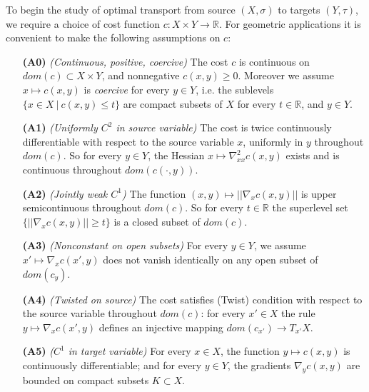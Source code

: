 \documentclass[12pt]{amsart}
\theoremstyle{remark}
\newcommand{\bR}{\mathbb{R}}
\begin{document}
To begin the study of optimal transport from source $(X,\sigma)$ to targets $(Y,\tau)$, we require a choice of cost function $c: X\times Y \to \bR$. For geometric applications it is convenient to make the following assumptions on $c$: 

\begin{itemize}
\item[\textbf{(A0)}]\emph{(Continuous, positive, coercive)} The cost $c$ is continuous on $dom(c) \subset X\times Y$, and nonnegative $c(x,y)\geq 0$. Moreover we assume $x\mapsto c(x,y)$ is \emph{coercive} for every $y\in Y$, i.e. the sublevels $\{x\in X~|~ c(x,y) \leq t\}$ are compact subsets of $X$ for every $t\in \bR$, and $y\in Y$.  


\item[\textbf{(A1)}]\emph{(Uniformly $C^2$ in source variable)} The cost is twice continuously differentiable with respect to the source variable $x$, uniformly in $y$ throughout $dom(c)$. So for every $y\in Y$, the Hessian $x\mapsto \nabla_{xx}^2 c(x,y)$ exists and is continuous throughout $dom(c(\cdot, y))$. 

\item[\textbf{(A2)}]\emph{(Jointly weak $C^1$)} The function $(x,y)\mapsto ||\nabla_x c(x,y)||$ is upper semicontinuous throughout $dom(c)$. So for every $t\in \bR$ the superlevel set $\{ ||\nabla_x c(x,y)|| \geq t\}$ is a closed subset of $dom(c)$. 

\item[\textbf{(A3)}]\emph{(Nonconstant on open subsets)} For every $y\in Y$, we assume $x'\mapsto \nabla_x c(x',y)$ does not vanish identically on any open subset of $dom(c_y)$.  



\item[\textbf{(A4)}]\emph{(Twisted on source)} The cost satisfies (Twist) condition with respect to the source variable throughout $dom(c)$: for every $x'\in X$ the rule $y\mapsto \nabla_x c(x',y)$ defines an injective mapping $dom(c_{x'}) \to T_{x'} X$. 

\item[\textbf{(A5)}]\emph{($C^1$ in target variable)}\label{A+} For every $x\in X$, the function $y\mapsto c(x,y)$ is continuously differentiable; and for every $y\in Y$, the gradients $\nabla_y c(x,y)$ are bounded on compact subsets $K\subset X$.
\end{itemize}
\end{document}
